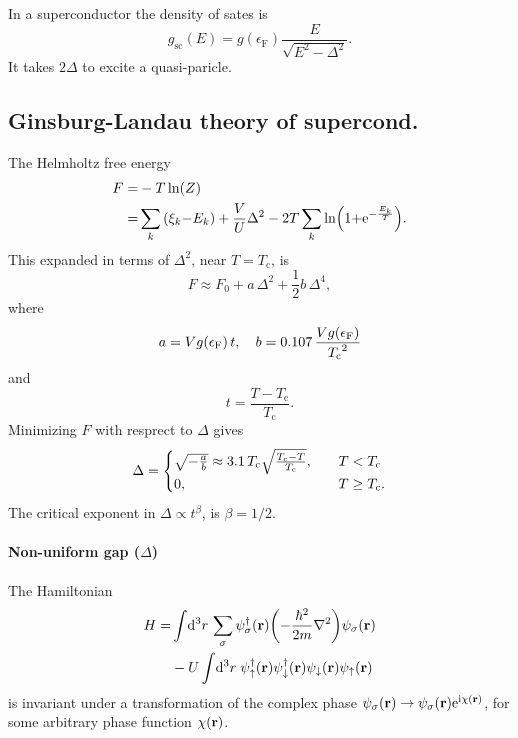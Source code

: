 \documentclass[11pt,letter, swedish, english, twocolumn
]{article}
\newcommand{\Tc}{\ensuremath{{T_{\text{c}}}}}
\newcommand{\eF}{\ensuremath{{\epsilon_{\text{F}}}}}
\begin{document}
In a superconductor the density of sates is
\begin{equation}
g_\text{sc}(E)=g(\eF)\frac{E}{\sqrt{E^2-\Delta^2}}.
\end{equation}
It takes $2\Delta$ to excite a quasi-paricle.

\subsection{Ginsburg-Landau theory of supercond.}
The Helmholtz free energy
\begin{equation}
\begin{aligned}
F=&-T\ln(Z)\\
=&\sum_k\qty(\xi_k{-}E_k) + \frac{V}{U}\Delta^2 
- 2T\sum_k \ln(1{+}\mathrm{e}^{-\frac{E_k}{T}}).
\end{aligned}
\end{equation}
This expanded in terms of $\Delta^2$, near $T=\Tc$, is
\begin{equation}
F\approx F_0+a\,\Delta^2
+\frac{1}{2}b\,\Delta^4,
\end{equation}
where
\begin{equation}
a=Vg(\eF)\,t\qcomma 
b=0.107\,\frac{Vg(\eF)}{\Tc^2}
\end{equation}
and
\begin{equation}
t=\frac{T-\Tc}{\Tc}.
\end{equation}
Minimizing $F$ with resprect to $\Delta$ gives
\begin{equation}
\Delta=
\begin{cases}
\sqrt{-\frac{a}{b}}\approx3.1\,\Tc\sqrt{\frac{\Tc-T}{\Tc}}\qcomma &T<\Tc\\
0,&T\ge\Tc.
\end{cases}
\end{equation}
The critical exponent in $\Delta\propto t^\beta$, is $\beta=1/2$.

\paragraph{Non-uniform gap ($\Delta$)}
The Hamiltonian 
\begin{equation}
\begin{aligned}
H=&\int\!\rd^3r\,\sum_\sigma \psi_\sigma^\dagger(\vb{r})
\qty(-\frac{\hbar^2}{2m}\laplacian)\psi_\sigma(\vb{r})\\
&-U\int\!\rd^3r\;
\psi_\uparrow^\dagger(\vb{r})\psi_\downarrow^\dagger(\vb{r})
\psi_\downarrow(\vb{r})\psi_\uparrow(\vb{r})
\end{aligned}
\end{equation}
is invariant under a transformation of the complex phase
$\psi_\sigma(\vb{r})\to\psi_\sigma(\vb{r})\mathrm{e}^{\mathrm{i}\chi(\vb{r})}$, for
some arbitrary phase function $\chi(\vb{r})$.
\end{document}
